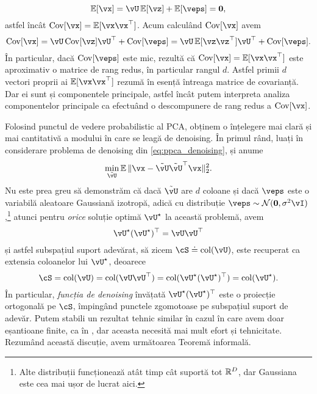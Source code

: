 \documentclass[../../book-main_ro.tex]{subfiles}
\begin{document}
\begin{equation}
    \Ex[\vx] = \vU\Ex[\vz] + \Ex[\veps] = \vzero,
\end{equation}
astfel încât \(\Cov[\vx] = \Ex[\vx\vx^{\top}]\). Acum calculând \(\Cov[\vx]\) avem 
\begin{equation}
    \Cov[\vx] = \vU\Cov[\vz]\vU^{\top} + \Cov[\veps] = \vU\Ex[\vz\vz^{\top}]\vU^{\top} + \Cov[\veps].
\end{equation}
În particular, dacă \(\Cov[\veps]\) este mic, rezultă că \(\Cov[\vx] = \Ex[\vx\vx^{\top}]\) este aproximativ o matrice de rang redus, în particular rangul \(d\). Astfel primii \(d\) vectori proprii ai \(\Ex[\vx\vx^{\top}]\) rezumă în esență întreaga matrice de covarianță. Dar ei sunt și componentele principale, astfel încât putem interpreta analiza componentelor principale ca efectuând o descompunere de rang redus a \(\Cov[\vx]\).

\begin{remark}
    Folosind punctul de vedere probabilistic al PCA, obținem o înțelegere mai clară și mai cantitativă a modului în care se leagă de denoising. În primul rând, luați în considerare problema de denoising din \eqref{eq:ppca_denoising}, și anume
    \begin{equation}
        \min_{\tilde{\vU}}\Ex\norm{\vx - \tilde{\vU}\tilde{\vU}^{\top}\vx}_{2}^{2}.
    \end{equation}
    Nu este prea greu să demonstrăm că dacă $\tilde{\vU}$ are $d$ coloane și dacă
    \(\veps\) este o variabilă aleatoare Gaussiană izotropă, adică cu distribuție \(\veps \sim \dNorm(\vzero,
    \sigma^{2}\vI)\),\footnote{Alte distribuții funcționează atât timp cât suportă
    tot \(\mathbb{R}^{D}\), dar Gaussiana este cea mai ușor de lucrat aici.} atunci
    pentru \textit{orice} soluție optimă
    \(\vU^{\star}\) la această problemă, avem 
    \begin{equation}
        \vU^{\star}(\vU^{\star})^{\top} = \vU\vU^{\top}
    \end{equation}
    și astfel subspațiul suport adevărat, să zicem \(\cS \doteq \mathop{\mathrm{col}}(\vU)\), este
    recuperat ca extensia coloanelor lui \(\vU^{\star}\), deoarece 
    \begin{equation}
        \cS = \mathop{\mathrm{col}}(\vU) = \mathop{\mathrm{col}}(\vU\vU^{\top})
        = \mathop{\mathrm{col}}(\vU^{\star}(\vU^{\star})^{\top})
        = \mathop{\mathrm{col}}(\vU^{\star}).
    \end{equation}
    În particular, \textit{funcția de denoising} învățată \(\vU^{\star}(\vU^{\star})^{\top}\) este o proiecție ortogonală pe \(\cS\), împingând punctele zgomotoase pe subspațiul suport de adevăr. Putem stabili un rezultat tehnic similar în cazul în care avem doar eșantioane finite, ca în , dar aceasta necesită mai mult efort și tehnicitate. Rezumând această discuție, avem următoarea Teoremă informală.
\end{remark}
\end{document}
